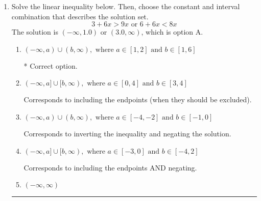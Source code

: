 \documentclass{extbook}[14pt]
\newcommand{\litem}[1]{\item #1

\rule{\textwidth}{0.4pt}}
\begin{document}
\begin{enumerate}
{\begin{enumerate}[label=\Alph*.]
* $(-8.00, -5.00]$, which is the correct option.
\item \( [a, b), \text{ where } a \in [-11, -3] \text{ and } b \in [-7, -1] \)

$[-8.00, -5.00)$, which corresponds to flipping the inequality.
\item \( (-\infty, a) \cup [b, \infty), \text{ where } a \in [-13, -3] \text{ and } b \in [-6, -2] \)

$(-\infty, -8.00) \cup [-5.00, \infty)$, which corresponds to displaying the and-inequality as an or-inequality.
\item \( (-\infty, a] \cup (b, \infty), \text{ where } a \in [-9, -7] \text{ and } b \in [-7, -1] \)

$(-\infty, -8.00] \cup (-5.00, \infty)$, which corresponds to displaying the and-inequality as an or-inequality AND flipping the inequality.
\item \( \text{None of the above.} \)


\end{enumerate}

\textbf{General Comment:} To solve, you will need to break up the compound inequality into two inequalities. Be sure to keep track of the inequality! It may be best to draw a number line and graph your solution.
}
\litem{
Solve the linear inequality below. Then, choose the constant and interval combination that describes the solution set.
\[ 3 + 6 x > 9 x \text{ or } 6 + 6 x < 8 x \]The solution is \( (-\infty, 1.0) \text{ or } (3.0, \infty) \), which is option A.\begin{enumerate}[label=\Alph*.]
\item \( (-\infty, a) \cup (b, \infty), \text{ where } a \in [1, 2] \text{ and } b \in [1, 6] \)

 * Correct option.
\item \( (-\infty, a] \cup [b, \infty), \text{ where } a \in [0, 4] \text{ and } b \in [3, 4] \)

Corresponds to including the endpoints (when they should be excluded).
\item \( (-\infty, a) \cup (b, \infty), \text{ where } a \in [-4, -2] \text{ and } b \in [-1, 0] \)

Corresponds to inverting the inequality and negating the solution.
\item \( (-\infty, a] \cup [b, \infty), \text{ where } a \in [-3, 0] \text{ and } b \in [-4, 2] \)

Corresponds to including the endpoints AND negating.
\item \( (-\infty, \infty) \)


\end{enumerate}}
\end{enumerate}
\end{document}
